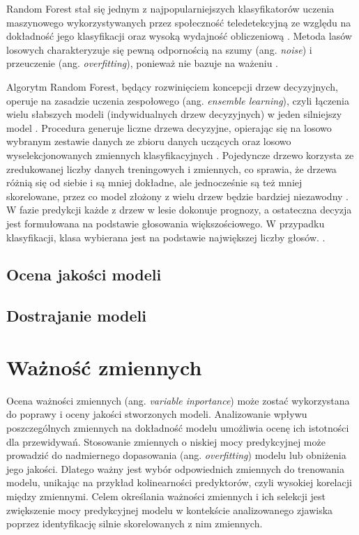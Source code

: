 \documentclass{amuthesis}
\begin{document}
Random Forest stał się jednym z najpopularniejszych klasyfikatorów
uczenia maszynowego wykorzystywanych przez społeczność teledetekcyjną ze
względu na dokładność jego klasyfikacji oraz wysoką wydajność
obliczeniową \autocite{belgiu_2016_rf,sheykhmousa_2020_svm_vs_rf}.
Metoda lasów losowych charakteryzuje się pewną odpornością na szumy
(ang. \emph{noise}) i przeuczenie (ang. \emph{overfitting}), ponieważ
nie bazuje na ważeniu \autocite{gislason_2006_rf}.

Algorytm Random Forest, będący rozwinięciem koncepcji drzew decyzyjnych,
operuje na zasadzie uczenia zespołowego (ang. \emph{ensemble learning}),
czyli łączenia wielu słabszych modeli (indywidualnych drzew decyzyjnych)
w jeden silniejszy model
\autocite{aaron_2018_ml,sekulic_2020_rf_interpolation}. Procedura
generuje liczne drzewa decyzyjne, opierając się na losowo wybranym
zestawie danych ze zbioru danych uczących oraz losowo wyselekcjonowanych
zmiennych klasyfikacyjnych \autocite{breiman_2001_rf}. Pojedyncze drzewo
korzysta ze zredukowanej liczby danych treningowych i zmiennych, co
sprawia, że drzewa różnią się od siebie i są mniej dokładne, ale
jednocześnie są też mniej skorelowane, przez co model złożony z wielu
drzew będzie bardziej niezawodny
\autocite{sekulic_2020_rf_interpolation}. W fazie predykcji każde z
drzew w lesie dokonuje prognozy, a ostateczna decyzja jest formułowana
na podstawie głosowania większościowego. W przypadku klasyfikacji, klasa
wybierana jest na podstawie największej liczby głosów.
\autocite{breiman_2001_rf}.

\hypertarget{ocena-jakoux15bci-modeli}{%
\subsection{Ocena jakości modeli}\label{ocena-jakoux15bci-modeli}}

\hypertarget{dostrajanie-modeli}{%
\subsection{Dostrajanie modeli}\label{dostrajanie-modeli}}

\hypertarget{waux17cnoux15bux107-zmiennych}{%
\section{Ważność zmiennych}\label{waux17cnoux15bux107-zmiennych}}

Ocena ważności zmiennych (ang. \emph{variable inportance}) może zostać
wykorzystana do poprawy i oceny jakości stworzonych modeli. Analizowanie
wpływu poszczególnych zmiennych na dokładność modelu umożliwia ocenę ich
istotności dla przewidywań. Stosowanie zmiennych o niskiej mocy
predykcyjnej może prowadzić do nadmiernego dopasowania (ang.
\emph{overfitting}) modelu lub obniżenia jego jakości. Dlatego ważny
jest wybór odpowiednich zmiennych do trenowania modelu, unikając na
przykład kolinearności predyktorów, czyli wysokiej korelacji między
zmiennymi. Celem określania ważności zmiennych i ich selekcji jest
zwiększenie mocy predykcyjnej modelu w kontekście analizowanego zjawiska
poprzez identyfikację silnie skorelowanych z nim zmiennych.
\end{document}
